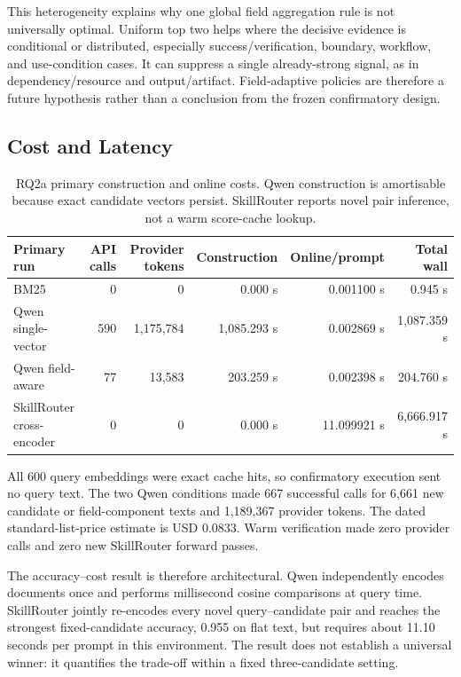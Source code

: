 This heterogeneity explains why one global field aggregation rule is not universally optimal. Uniform top two helps where the decisive evidence is conditional or distributed, especially success/verification, boundary, workflow, and use-condition cases. It can suppress a single already-strong signal, as in dependency/resource and output/artifact. Field-adaptive policies are therefore a future hypothesis rather than a conclusion from the frozen confirmatory design.

\subsection{Cost and Latency}

\begin{table}[H]
\centering
\scriptsize
\setlength{\tabcolsep}{2pt}
\begin{tabular}{p{}rrrrr}
\toprule
Primary run & API calls & Provider tokens & Construction & Online/prompt & Total wall \\
\midrule
BM25 & 0 & 0 & 0.000 s & 0.001100 s & 0.945 s \\
Qwen single-vector & 590 & 1,175,784 & 1,085.293 s & 0.002869 s & 1,087.359 s \\
Qwen field-aware & 77 & 13,583 & 203.259 s & 0.002398 s & 204.760 s \\
SkillRouter cross-encoder & 0 & 0 & 0.000 s & 11.099921 s & 6,666.917 s \\
\bottomrule
\end{tabular}
\caption{RQ2a primary construction and online costs. Qwen construction is amortisable because exact candidate vectors persist. SkillRouter reports novel pair inference, not a warm score-cache lookup.}
\label{tab:rq2a-cost}
\end{table}

All 600 query embeddings were exact cache hits, so confirmatory execution sent no query text. The two Qwen conditions made 667 successful calls for 6,661 new candidate or field-component texts and 1,189,367 provider tokens. The dated standard-list-price estimate is USD 0.0833. Warm verification made zero provider calls and zero new SkillRouter forward passes.

The accuracy--cost result is therefore architectural. Qwen independently encodes documents once and performs millisecond cosine comparisons at query time. SkillRouter jointly re-encodes every novel query--candidate pair and reaches the strongest fixed-candidate accuracy, 0.955 on flat text, but requires about 11.10 seconds per prompt in this environment. The result does not establish a universal winner: it quantifies the trade-off within a fixed three-candidate setting.

